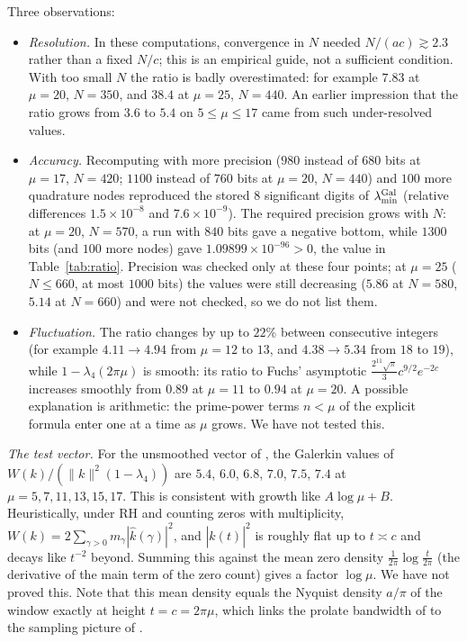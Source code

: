 \documentclass[11pt]{amsart}
\theoremstyle{remark}
\numberwithin{equation}{section}
\begin{document}
Three observations:
\begin{itemize}
\item \emph{Resolution.} In these computations, convergence in $N$ needed $N/(ac)\gtrsim2.3$ rather than a fixed $N/c$; this is an empirical guide, not a sufficient condition. With too small $N$ the ratio is badly overestimated: for example $7.83$ at $\mu=20$, $N=350$, and $38.4$ at $\mu=25$, $N=440$. An earlier impression that the ratio grows from $3.6$ to $5.4$ on $5\le\mu\le17$ came from such under-resolved values.
\item \emph{Accuracy.} Recomputing with more precision ($980$ instead of $680$ bits at $\mu=17$, $N=420$; $1100$ instead of $760$ bits at $\mu=20$, $N=440$) and $100$ more quadrature nodes reproduced the stored $8$ significant digits of $\lambda_{\min}^{\rm Gal}$ (relative differences $1.5\times10^{-8}$ and $7.6\times10^{-9}$). The required precision grows with $N$: at $\mu=20$, $N=570$, a run with $840$ bits gave a negative bottom, while $1300$ bits (and $100$ more nodes) gave $1.09899\times10^{-96}>0$, the value in Table~\ref{tab:ratio}. Precision was checked only at these four points; at $\mu=25$ ($N\le660$, at most $1000$ bits) the values were still decreasing ($5.86$ at $N=580$, $5.14$ at $N=660$) and were not checked, so we do not list them.
\item \emph{Fluctuation.} The ratio changes by up to $22\%$ between consecutive integers (for example $4.11\to4.94$ from $\mu=12$ to $13$, and $4.38\to5.34$ from $18$ to $19$), while $1-\lambda_4(2\pi\mu)$ is smooth: its ratio to Fuchs' asymptotic $\frac{2^{11}\sqrt\pi}3c^{9/2}e^{-2c}$ increases smoothly from $0.89$ at $\mu=11$ to $0.94$ at $\mu=20$. A possible explanation is arithmetic: the prime-power terms $n<\mu$ of the explicit formula enter one at a time as $\mu$ grows. We have not tested this.
\end{itemize}

\emph{The test vector.} For the unsmoothed vector of \cite{MoriWeilII}, the Galerkin values of $W(k)/(\|k\|^2(1-\lambda_4))$ are $5.4$, $6.0$, $6.8$, $7.0$, $7.5$, $7.4$ at $\mu=5,7,11,13,15,17$. This is consistent with growth like $A\log\mu+B$. Heuristically, under RH and counting zeros with multiplicity, $W(k)=2\sum_{\gamma>0}m_\gamma|\hat k(\gamma)|^2$, and $|\hat k(t)|^2$ is roughly flat up to $t\asymp c$ and decays like $t^{-2}$ beyond. Summing this against the mean zero density $\frac1{2\pi}\log\frac t{2\pi}$ (the derivative of the main term of the zero count) gives a factor $\log\mu$. We have not proved this. Note that this mean density equals the Nyquist density $a/\pi$ of the window exactly at height $t=c=2\pi\mu$, which links the prolate bandwidth of \cite{MoriWeilII} to the sampling picture of \cite{MoriWeilIV}.
\end{document}
